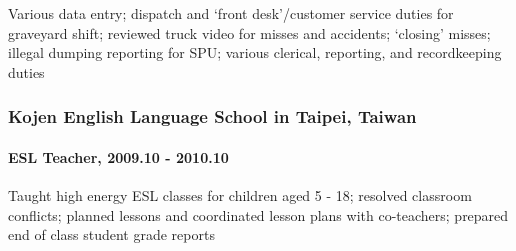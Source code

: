 \documentclass[a4paper, 10pt, oneside, hidelinks]{article}
\begin{document}
Various data entry; dispatch and ‘front desk’/customer service duties for graveyard shift; reviewed truck video for misses and accidents; ‘closing’ misses; illegal dumping reporting for SPU; various clerical, reporting, and recordkeeping duties
\subsubsection*{Kojen English Language School in Taipei, Taiwan}
\label{sec:orgheadline17}
\paragraph*{ESL Teacher, 2009.10 - 2010.10}
\label{sec:orgheadline16}

Taught high energy ESL classes for children aged 5 - 18; resolved classroom conflicts; planned lessons and coordinated lesson plans with co-teachers; prepared end of class student grade reports
\end{document}
